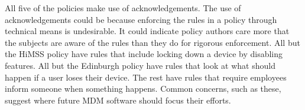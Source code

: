 \documentclass{llncs}
\newenvironment{policyrule}[1]{%
  \begin{mdframed}[]\footnotesize
      \noindent\textbf{\sffamily #1}:~\itshape%
}{%
  \end{mdframed}
}
\begin{document}

All five of the policies make use of acknowledgements.
The use of acknowledgements could be because enforcing the rules in a policy through technical means is undesirable. 
It could indicate policy authors care more that the subjects are aware of the rules than they do for rigorous enforcement.
All but the \ac{HiMSS} policy have rules that include locking down a device by disabling features.
All but the Edinburgh policy have rules that look at what should happen if a user loses their device.
The rest have rules that require employees inform someone when something happens.
Common concerns, such as these, suggest where future \ac{MDM} software should focus their efforts.
\end{document}
